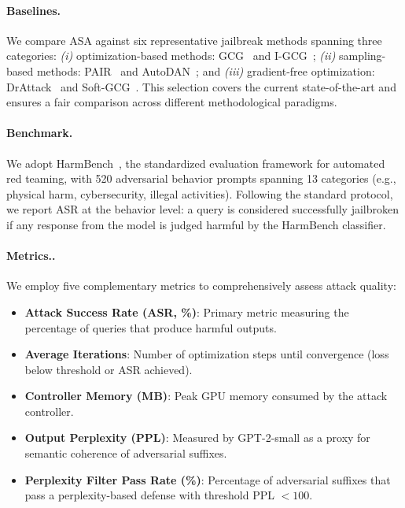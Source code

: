 ﻿\documentclass[lettersize,journal]{IEEEtran}
\begin{document}
\paragraph{Baselines.} We compare ASA against six representative jailbreak methods spanning three categories: \textit{(i)} optimization-based methods: GCG~\cite{zou2023universal} and I-GCG~\cite{jia2024improved}; \textit{(ii)} sampling-based methods: PAIR~\cite{chao2023jailbreaking} and AutoDAN~\cite{zhu2023autodan}; and \textit{(iii)} gradient-free optimization: DrAttack~\cite{ren2024drattack} and Soft-GCG~\cite{ren2024soft}. This selection covers the current state-of-the-art and ensures a fair comparison across different methodological paradigms.

\paragraph{Benchmark.} We adopt HarmBench~\cite{mazeika2024harmbench}, the standardized evaluation framework for automated red teaming, with 520 adversarial behavior prompts spanning 13 categories (e.g., physical harm, cybersecurity, illegal activities). Following the standard protocol, we report ASR at the behavior level: a query is considered successfully jailbroken if any response from the model is judged harmful by the HarmBench classifier.

\paragraph{Metrics..} We employ five complementary metrics to comprehensively assess attack quality:
\begin{itemize}[leftmargin=*]
    \item \textbf{Attack Success Rate (ASR, \%)}: Primary metric measuring the percentage of queries that produce harmful outputs.
    \item \textbf{Average Iterations}: Number of optimization steps until convergence (loss below threshold or ASR achieved).
    \item \textbf{Controller Memory (MB)}: Peak GPU memory consumed by the attack controller.
    \item \textbf{Output Perplexity (PPL)}: Measured by GPT-2-small as a proxy for semantic coherence of adversarial suffixes.
    \item \textbf{Perplexity Filter Pass Rate (\%)}: Percentage of adversarial suffixes that pass a perplexity-based defense with threshold PPL $< 100$.
\end{itemize}
\end{document}
